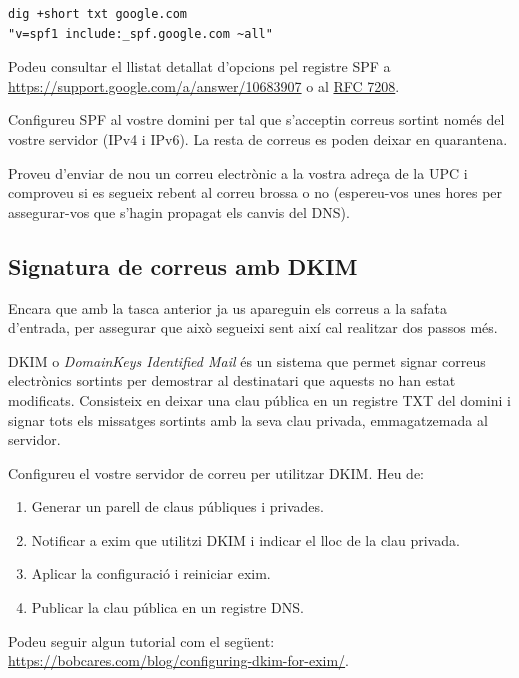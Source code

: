 \documentclass{practicaitic}
\begin{document}
\begin{verbatim}
dig +short txt google.com
"v=spf1 include:_spf.google.com ~all"
\end{verbatim}

Podeu consultar el llistat detallat d'opcions pel registre SPF a
\url{https://support.google.com/a/answer/10683907} o al
\href{https://datatracker.ietf.org/doc/html/rfc7208}{RFC 7208}.

\begin{tasca}
  Configureu SPF al vostre domini per tal que s'acceptin correus sortint només
  del vostre servidor (IPv4 i IPv6). La resta de correus es poden deixar en
  quarantena.

  Proveu d'enviar de nou un correu electrònic a la vostra adreça de la UPC
  i comproveu si es segueix rebent al correu brossa o no (espereu-vos unes hores
  per assegurar-vos que s'hagin propagat els canvis del DNS).
\end{tasca}

\subsection{Signatura de correus amb DKIM}

Encara que amb la tasca anterior ja us apareguin els correus a la safata
d'entrada, per assegurar que això segueixi sent així cal realitzar dos passos
més.

DKIM o \textit{DomainKeys Identified Mail} és un sistema que permet signar
correus electrònics sortints per demostrar al destinatari que aquests no han
estat modificats.
Consisteix en deixar una clau pública en un registre TXT del domini i signar
tots els missatges sortints amb la seva clau privada, emmagatzemada al servidor.

\begin{tasca}
  Configureu el vostre servidor de correu per utilitzar DKIM. Heu de:
  \begin{enumerate}
    \item Generar un parell de claus públiques i privades.
    \item Notificar a exim que utilitzi DKIM i indicar el lloc de la clau privada.
    \item Aplicar la configuració i reiniciar exim.
    \item Publicar la clau pública en un registre DNS.
  \end{enumerate}
\end{tasca}

Podeu seguir algun tutorial com el següent: \url{https://bobcares.com/blog/configuring-dkim-for-exim/}.
\end{document}

